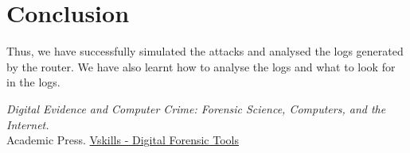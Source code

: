\documentclass[11pt]{article}
\begin{document}
\section{Conclusion}
Thus, we have successfully simulated the attacks and analysed the logs generated by the router. We have also learnt how to analyse the logs and what to look for in the logs.
\clearpage

\pagebreak
\begin{thebibliography}{}
    \textit{Digital Evidence and Computer Crime: Forensic Science, Computers, and the Internet.} \\Academic Press.
    \href{https://www.vskills.in/certification/tutorial/digital-forensics-tools/}{Vskills - Digital Forensic Tools}

\end{thebibliography}
\end{document}
